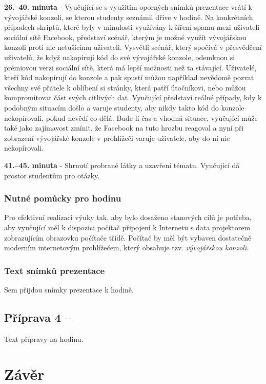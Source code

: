 \documentclass[a4paper, 12pt]{article}
\begin{document}
\textbf{26.--40. minuta} - Vyučující se s využitím oporných snímků prezentace vrátí k vývojářské konzoli, se kterou studenty seznámil dříve v hodině. Na konkrétních případech skriptů, které byly v minulosti využívány k šíření spamu mezi uživateli sociální sítě Facebook, představí scénář, kterým je možné využít vývojářskou konzoli proti nic netušícímu uživateli. Vysvětlí scénář, který spočívá v přesvědčení uživatelů, že když nakopírují kód do své vývojářské konzole, odemknou si prémiovou verzi sociální sítě, která má lepší možnosti než ta stávající. Uživatelé, kteří kód nakopírují do konzole a pak spustí můžou například nevědomě pozvat všechny své přátele k oblíbení si stránky, která patří útočníkovi, nebo můžou kompromitovat část svých citlivých dat. Vyučující představí reálné případy, kdy k podobným situacím došlo a varuje studenty, aby nikdy takto kód do konzole nekopírovali, pokud nevědí co dělá. Bude-li čas a vhodná situace, vyučující může také jako zajímavost zmínit, že Facebook na tuto hrozbu reagoval a nyní při zobrazení vývojářské konzole v prohlížeči varuje uživatele, aby do ní nic nekopírovali.

\textbf{41.--45. minuta} - Shrnutí probrané látky a uzavření tématu. Vyučující dá prostor studentům pro otázky.

\subsubsection{Nutné pomůcky pro hodinu}
Pro efektivní realizaci výuky tak, aby bylo dosaženo stanových cílů je potřeba, aby vyučující měl k dispozici počítač připojení k Internetu s data projektorem zobrazujícím obrazovku počítače třídě. Počítač by měl být vybaven dostatečně moderním internetovým prohlížečem, který obsahuje tzv. \textit{vývojářskou konzoli}.

\subsubsection{Text snímků prezentace}
Sem přijdou snímky prezentace k hodině.


\subsection{Příprava 4 -- }
Text přípravy na hodinu.

\newpage
\section{Závěr}
\end{document}
